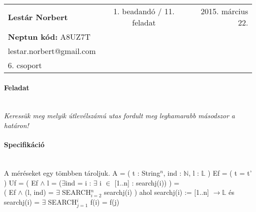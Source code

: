 \documentclass[12pt]{report}
\begin{document}
\begin{tabular}{lcr}
\textbf{Lestár Norbert} & 1. beadandó / 11. feladat  & 2015. március 22. \\
\textbf{Neptun kód:} A8UZ7T \\
lestar.norbert@gmail.com \\
6. csoport \\
\end{tabular}
\paragraph{Feladat} \hspace{0pt} \\
\textit{Keressük meg melyik útlevélszámú utas fordult meg leghamarabb másodszor a határon!}
\paragraph{Specifikáció} \hspace{0pt} \\
A méréseket egy tömbben tároljuk. \newline
A = ( t : String$^{n}$, ind : $\mathbb{N}$, l : $\mathbb{L}$ ) \newline
Ef = ( t = t' ) \newline
Uf = ( Ef $\wedge$ l = ($\exists$ind = i : $\exists$ i $\in$ [1..n] : searchj(i)) ) = \\
( Ef $\wedge$ (l, ind) = $\exists$ SEARCH$_{i=2}^{n}$ searchj(i) ) \newline
 ahol searchj(i) := [1..n] $\rightarrow \mathbb{L}$ és searchj(i) = $\exists$ SEARCH$_{j=1}^{i}$ f(i) = f(j) \newline
\noindent\hfill
\begin{stukibox}[5cm]
\end{stukibox}%
\hfill
\begin{stukibox}[5cm]
\end{stukibox}%
\noindent\hfill \newline \\
\begin{stukibox}[5cm]
\begin{WHILE}{2}{}
\end{WHILE}
\end{stukibox}%
\hfill
\begin{stukibox}[5cm]
\begin{WHILE}{2}{}
\end{WHILE}
\end{stukibox}%
\hfill
\end{document}
